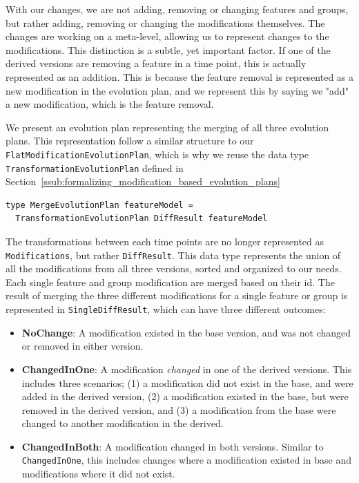 \documentclass[a4paper,english]{ifimaster}
\begin{document}
With our changes, we are not adding, removing or changing features and groups, but rather adding, removing or changing the modifications themselves. The changes are working on a meta-level, allowing us to represent changes to the modifications. This distinction is a subtle, yet important factor. If one of the derived versions are removing a feature in a time point, this is actually represented as an addition. This is because the feature removal is represented as a new modification in the evolution plan, and we represent this by saying we "add" a new modification, which is the feature removal.

We present an evolution plan representing the merging of all three evolution plans. This representation follow a similar structure to our \texttt{Flat\-Modification\-Evolution\-Plan}, which is why we reuse the data type \texttt{Transformation\-Evolution\-Plan} defined in Section~\vref{ssub:formalizing_modification_based_evolution_plans}

\begin{verbatim}
type MergeEvolutionPlan featureModel = 
  TransformationEvolutionPlan DiffResult featureModel
\end{verbatim}

The transformations between each time points are no longer represented as \texttt{Modifications}, but rather \texttt{DiffResult}. This data type represents the union of all the modifications from all three versions, sorted and organized to our needs. Each single feature and group modification are merged based on their id. The result of merging the three different modifications for a single feature or group is represented in \texttt{SingleDiffResult}, which can have three different outcomes:

\begin{itemize}
  \item \textbf{NoChange}: A modification existed in the base version, and was not changed or removed in either version.
  \item \textbf{ChangedInOne}: A modification \textit{changed} in one of the derived versions. This includes three scenarios; (1) a modification did not exist in the base, and were added in the derived version, (2) a modification existed in the base, but were removed in the derived version, and (3) a modification from the base were changed to another modification in the derived.
  \item \textbf{ChangedInBoth}: A modification changed in both versions. Similar to \texttt{ChangedInOne}, this includes changes where a modification existed in base and modifications where it did not exist.
\end{itemize}
\end{document}
